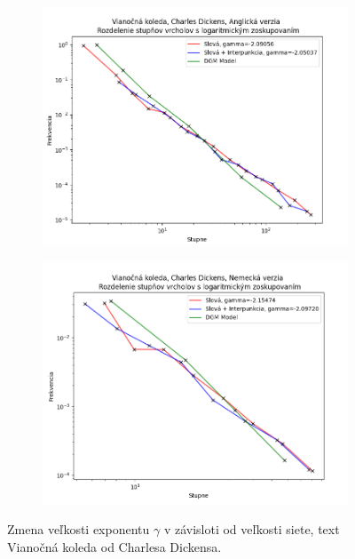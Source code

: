 \begin{figure}[htbp]
    \centering
    \begin{subfigure}[b]{0.9\textwidth}
        \includegraphics[width=\textwidth]{images/lbdegdist/Screenshot_1.png}
    \end{subfigure}

    \vspace{0.3cm}

    \begin{subfigure}[b]{0.9\textwidth}
        \includegraphics[width=\textwidth]{images/lbdegdist/Screenshot_2.png}
    \end{subfigure}
    
    \vspace{0.3cm}
    \caption{Zmena veľkosti exponentu $\gamma$ v závisloti od veľkosti siete, text Vianočná koleda od Charlesa Dickensa.}
\end{figure}

